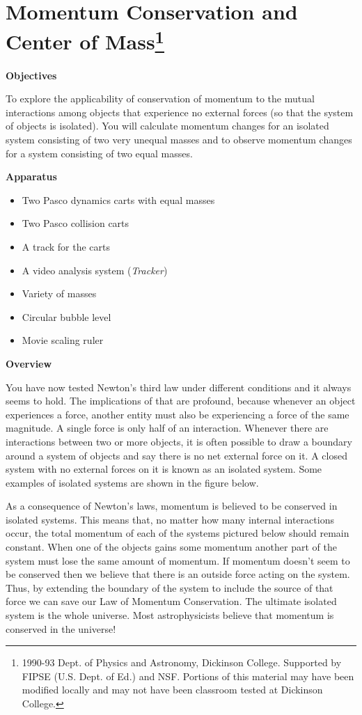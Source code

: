 
\section{Momentum Conservation and Center of Mass\footnote{
1990-93 Dept. of Physics and Astronomy, Dickinson College. Supported by FIPSE
(U.S. Dept. of Ed.) and NSF. Portions of this material may have been modified
locally and may not have been classroom tested at Dickinson College.
}}

\makelabheader %

\textbf{Objectives }

To explore the applicability of conservation of momentum to the mutual interactions
among objects that experience no external forces (so that the system of objects
is isolated). You will calculate momentum changes for an isolated system consisting
of two very unequal masses and to observe momentum changes for a system consisting
of two equal masses. 

\textbf{Apparatus}

\begin{itemize}
\item Two Pasco dynamics carts with equal masses
\item Two Pasco collision carts
\item A track for the carts
\item A video analysis system (\textit{Tracker})
\item Variety of masses
\item Circular bubble level
\item Movie scaling ruler
\end{itemize}
\textbf{Overview }

You have now tested Newton's third law under different conditions and it always
seems to hold. The implications of that are profound, because whenever an object
experiences a force, another entity must also be experiencing a force of the
same magnitude. A single force is only half of an interaction. Whenever there
are interactions between two or more objects, it is often possible to draw a
boundary around a system of objects and say there is no net external force on
it. A closed system with no external forces on it is known as an isolated system.
Some examples of isolated systems are shown in the figure below.

As a consequence of Newton's laws, momentum is believed to be conserved in isolated
systems. This means that, no matter how many internal interactions occur, the
total momentum of each of the systems pictured below should remain constant.
When one of the objects gains some momentum another part of the system must
lose the same amount of momentum. If momentum doesn't seem to be conserved then
we believe that there is an outside force acting on the system. Thus, by extending
the boundary of the system to include the source of that force we can save our
Law of Momentum Conservation. The ultimate isolated system is the whole universe.
Most astrophysicists believe that momentum is conserved in the universe!

